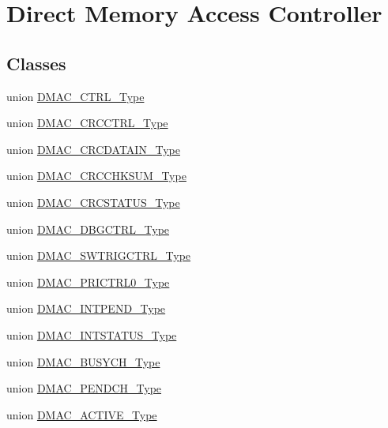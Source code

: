 \hypertarget{group___s_a_m_l21___d_m_a_c}{}\section{Direct Memory Access Controller}
\label{group___s_a_m_l21___d_m_a_c}
\subsection*{Classes}
\begin{DoxyCompactItemize}
\item 
union \hyperlink{union_d_m_a_c___c_t_r_l___type}{D\+M\+A\+C\+\_\+\+C\+T\+R\+L\+\_\+\+Type}
\item 
union \hyperlink{union_d_m_a_c___c_r_c_c_t_r_l___type}{D\+M\+A\+C\+\_\+\+C\+R\+C\+C\+T\+R\+L\+\_\+\+Type}
\item 
union \hyperlink{union_d_m_a_c___c_r_c_d_a_t_a_i_n___type}{D\+M\+A\+C\+\_\+\+C\+R\+C\+D\+A\+T\+A\+I\+N\+\_\+\+Type}
\item 
union \hyperlink{union_d_m_a_c___c_r_c_c_h_k_s_u_m___type}{D\+M\+A\+C\+\_\+\+C\+R\+C\+C\+H\+K\+S\+U\+M\+\_\+\+Type}
\item 
union \hyperlink{union_d_m_a_c___c_r_c_s_t_a_t_u_s___type}{D\+M\+A\+C\+\_\+\+C\+R\+C\+S\+T\+A\+T\+U\+S\+\_\+\+Type}
\item 
union \hyperlink{union_d_m_a_c___d_b_g_c_t_r_l___type}{D\+M\+A\+C\+\_\+\+D\+B\+G\+C\+T\+R\+L\+\_\+\+Type}
\item 
union \hyperlink{union_d_m_a_c___s_w_t_r_i_g_c_t_r_l___type}{D\+M\+A\+C\+\_\+\+S\+W\+T\+R\+I\+G\+C\+T\+R\+L\+\_\+\+Type}
\item 
union \hyperlink{union_d_m_a_c___p_r_i_c_t_r_l0___type}{D\+M\+A\+C\+\_\+\+P\+R\+I\+C\+T\+R\+L0\+\_\+\+Type}
\item 
union \hyperlink{union_d_m_a_c___i_n_t_p_e_n_d___type}{D\+M\+A\+C\+\_\+\+I\+N\+T\+P\+E\+N\+D\+\_\+\+Type}
\item 
union \hyperlink{union_d_m_a_c___i_n_t_s_t_a_t_u_s___type}{D\+M\+A\+C\+\_\+\+I\+N\+T\+S\+T\+A\+T\+U\+S\+\_\+\+Type}
\item 
union \hyperlink{union_d_m_a_c___b_u_s_y_c_h___type}{D\+M\+A\+C\+\_\+\+B\+U\+S\+Y\+C\+H\+\_\+\+Type}
\item 
union \hyperlink{union_d_m_a_c___p_e_n_d_c_h___type}{D\+M\+A\+C\+\_\+\+P\+E\+N\+D\+C\+H\+\_\+\+Type}
\item 
union \hyperlink{union_d_m_a_c___a_c_t_i_v_e___type}{D\+M\+A\+C\+\_\+\+A\+C\+T\+I\+V\+E\+\_\+\+Type}

\end{DoxyCompactItemize}
